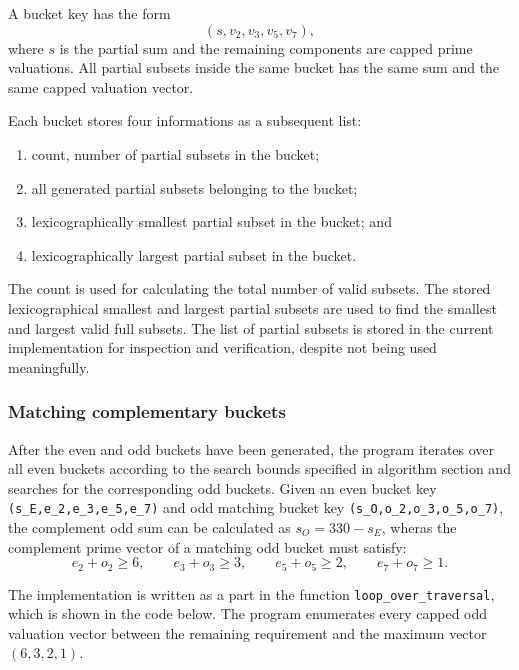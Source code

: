 \documentclass[11pt,a4paper]{article}
\begin{document}
A bucket key has the form
\[
(s,v_2,v_3,v_5,v_7),
\]
where $s$ is the partial sum and the remaining components are capped prime valuations. All partial subsets inside the same bucket has the same sum and the same capped valuation vector.

Each bucket stores four informations as a subsequent list:

\begin{enumerate}
    \item count, number of partial subsets in the bucket;
    \item all generated partial subsets belonging to the bucket;
    \item lexicographically smallest partial subset in the bucket; and
    \item lexicographically largest partial subset in the bucket.
\end{enumerate}

The count is used for calculating the total number of valid subsets. The stored lexicographical smallest and largest partial subsets are used to find the smallest and largest valid full subsets. The list of partial subsets is stored in the current implementation for inspection and verification, despite not being used meaningfully.


\subsubsection*{Matching complementary buckets}

After the even and odd buckets have been generated, the program iterates over all even buckets according to the search bounds specified in algorithm section and searches for the corresponding odd buckets. Given an even bucket key \texttt{(s\_E,e\_2,e\_3,e\_5,e\_7)} and odd matching bucket key \texttt{(s\_O,o\_2,o\_3,o\_5,o\_7)}, the complement odd sum can be calculated as $s_O=330-s_E$, wheras the complement prime vector of a matching odd bucket must satisfy:
\[
e_2+o_2\geq 6,
\qquad
e_3+o_3\geq 3,
\qquad
e_5+o_5\geq 2,
\qquad
e_7+o_7\geq 1.
\]

The implementation is written as a part in the function \texttt{loop\_over\_traversal}, which is shown in the code below. The program enumerates every capped odd valuation vector between the remaining requirement and the maximum vector $(6,3,2,1)$.
\end{document}
